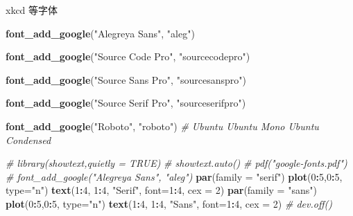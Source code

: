 \documentclass[a4paper,oneside,UTF8]{book}
\newenvironment{Shaded}{\begin{snugshade}}{\end{snugshade}}
\newcommand{\CommentTok}[1]{\textcolor[rgb]{0.56,0.35,0.01}{\textit{#1}}}
\newcommand{\DataTypeTok}[1]{\textcolor[rgb]{0.13,0.29,0.53}{#1}}
\newcommand{\DecValTok}[1]{\textcolor[rgb]{0.00,0.00,0.81}{#1}}
\newcommand{\KeywordTok}[1]{\textcolor[rgb]{0.13,0.29,0.53}{\textbf{#1}}}
\newcommand{\NormalTok}[1]{#1}
\newcommand{\OperatorTok}[1]{\textcolor[rgb]{0.81,0.36,0.00}{\textbf{#1}}}
\newcommand{\StringTok}[1]{\textcolor[rgb]{0.31,0.60,0.02}{#1}}
\begin{document}
xkcd 等字体

\begin{Shaded}
\begin{Highlighting}[]
\KeywordTok{font_add_google}\NormalTok{(}\StringTok{"Alegreya Sans"}\NormalTok{, }\StringTok{"aleg"}\NormalTok{)}

\KeywordTok{font_add_google}\NormalTok{(}\StringTok{"Source Code Pro"}\NormalTok{, }\StringTok{"sourcecodepro"}\NormalTok{)}

\KeywordTok{font_add_google}\NormalTok{(}\StringTok{"Source Sans Pro"}\NormalTok{, }\StringTok{"sourcesanspro"}\NormalTok{)}

\KeywordTok{font_add_google}\NormalTok{(}\StringTok{"Source Serif Pro"}\NormalTok{, }\StringTok{"sourceserifpro"}\NormalTok{)}

\KeywordTok{font_add_google}\NormalTok{(}\StringTok{"Roboto"}\NormalTok{, }\StringTok{"roboto"}\NormalTok{)}
\CommentTok{# Ubuntu Ubuntu Mono Ubuntu Condensed}
\end{Highlighting}
\end{Shaded}

\begin{Shaded}
\begin{Highlighting}[]
\CommentTok{# library(showtext,quietly = TRUE)}
\CommentTok{# showtext.auto()}
\CommentTok{# pdf("google-fonts.pdf")}
\CommentTok{# font_add_google("Alegreya Sans", "aleg")}
\KeywordTok{par}\NormalTok{(}\DataTypeTok{family =} \StringTok{"serif"}\NormalTok{)}
\KeywordTok{plot}\NormalTok{(}\DecValTok{0}\OperatorTok{:}\DecValTok{5}\NormalTok{,}\DecValTok{0}\OperatorTok{:}\DecValTok{5}\NormalTok{, }\DataTypeTok{type=}\StringTok{"n"}\NormalTok{)}
\KeywordTok{text}\NormalTok{(}\DecValTok{1}\OperatorTok{:}\DecValTok{4}\NormalTok{, }\DecValTok{1}\OperatorTok{:}\DecValTok{4}\NormalTok{, }\StringTok{"Serif"}\NormalTok{, }\DataTypeTok{font=}\DecValTok{1}\OperatorTok{:}\DecValTok{4}\NormalTok{, }\DataTypeTok{cex =} \DecValTok{2}\NormalTok{)}
\KeywordTok{par}\NormalTok{(}\DataTypeTok{family =} \StringTok{"sans"}\NormalTok{)}
\KeywordTok{plot}\NormalTok{(}\DecValTok{0}\OperatorTok{:}\DecValTok{5}\NormalTok{,}\DecValTok{0}\OperatorTok{:}\DecValTok{5}\NormalTok{, }\DataTypeTok{type=}\StringTok{"n"}\NormalTok{)}
\KeywordTok{text}\NormalTok{(}\DecValTok{1}\OperatorTok{:}\DecValTok{4}\NormalTok{, }\DecValTok{1}\OperatorTok{:}\DecValTok{4}\NormalTok{, }\StringTok{"Sans"}\NormalTok{, }\DataTypeTok{font=}\DecValTok{1}\OperatorTok{:}\DecValTok{4}\NormalTok{, }\DataTypeTok{cex =} \DecValTok{2}\NormalTok{)}
\CommentTok{# dev.off()}
\end{Highlighting}
\end{Shaded}
\end{document}
